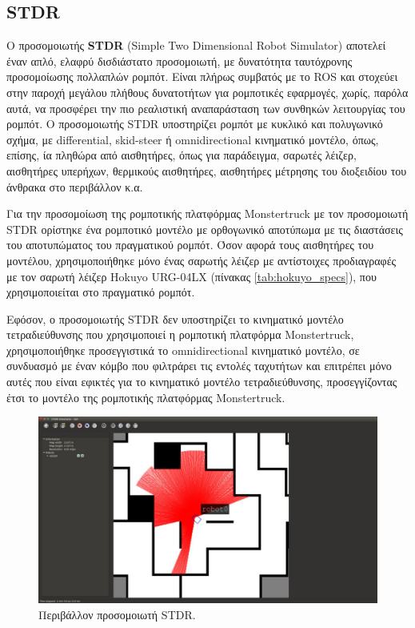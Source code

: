 \subsection{STDR} \label{ssec:stdr}
Ο προσομοιωτής \textbf{STDR} (Simple Two Dimensional Robot Simulator) αποτελεί έναν απλό, ελαφρύ δισδιάστατο προσομοιωτή, με δυνατότητα ταυτόχρονης προσομοίωσης πολλαπλών ρομπότ. Είναι πλήρως συμβατός με το ROS και στοχεύει στην παροχή μεγάλου πλήθους δυνατοτήτων για ρομποτικές εφαρμογές, χωρίς, παρόλα αυτά, να προσφέρει την πιο ρεαλιστική αναπαράσταση των συνθηκών λειτουργίας του ρομπότ. Ο προσομοιωτής STDR υποστηρίζει ρομπότ με κυκλικό και πολυγωνικό σχήμα, με differential, skid-steer ή omnidirectional κινηματικό μοντέλο, όπως, επίσης, ία πληθώρα από αισθητήρες, όπως για παράδειγμα, σαρωτές λέιζερ, αισθητήρες υπερήχων, θερμικούς αισθητήρες, αισθητήρες μέτρησης του διοξειδίου του άνθρακα στο περιβάλλον κ.α. 

\bigskip
Για την προσομοίωση της ρομποτικής πλατφόρμας Monstertruck με τον προσομοιωτή STDR ορίστηκε ένα ρομποτικό μοντέλο με ορθογωνικό αποτύπωμα με τις διαστάσεις του αποτυπώματος του πραγματικού ρομπότ. Όσον αφορά τους αισθητήρες του μοντέλου, χρησιμοποιήθηκε μόνο ένας σαρωτής λέιζερ με αντίστοιχες προδιαγραφές με τον σαρωτή λέιζερ Hokuyo URG-04LX  (πίνακας \ref{tab:hokuyo_specs}), που χρησιμοποιείται στο πραγματικό ρομπότ.

\bigskip
Εφόσον, ο προσομοιωτής STDR δεν υποστηρίζει το κινηματικό μοντέλο τετραδιεύθυνσης που χρησιμοποιεί η ρομποτική πλατφόρμα Monstertruck, χρησιμοποιήθηκε προσεγγιστικά το omnidirectional κινηματικό μοντέλο, σε συνδυασμό με έναν κόμβο που φιλτράρει τις εντολές ταχυτήτων και επιτρέπει μόνο αυτές που είναι εφικτές για το κινηματικό μοντέλο τετραδιεύθυνσης, προσεγγίζοντας έτσι το μοντέλο της ρομποτικής πλατφόρμας Monstertruck.

\begin{figure}[!ht]
	\centering
	\includegraphics[width=0.7\linewidth]{Chapters/Chapter4/Figures/stdr_simulator.jpg}
	\caption{Περιβάλλον προσομοιωτή STDR.}
	\label{fig:stdr_simulator}
\end{figure}

